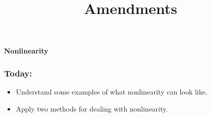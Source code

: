 \documentclass[aspectratio=169]{beamer}
\title{Amendments}
\date{}
\theoremstyle{principle}
\begin{document}


{
  \begin{frame}[plain]
  
\begin{mdframed}[tikzsetting={draw=white,fill=white,fill opacity=0.6,draw opacity=0.4,
               line width=0pt},backgroundcolor=none,leftmargin=20,
               rightmargin=20,innertopmargin=4pt]
\begin{center}
\Huge \textbf{Nonlinearity}
\end{center}
\end{mdframed}

  \end{frame}
}


%

\begin{frame}
\frametitle{Today:}

\begin{itemize}
\item Understand some examples of what nonlinearity can look like.
\bigskip
\bigskip
\bigskip

\item Apply two methods for dealing with nonlinearity.

\end{itemize}

\end{frame}
\end{document}
